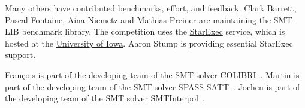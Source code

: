 \documentclass[12pt]{article}
\begin{document}
Many others have contributed benchmarks, effort, and feedback.  Clark Barrett,
Pascal Fontaine, Aina Niemetz and Mathias Preiner are maintaining the SMT-LIB
benchmark library.
The competition uses the
\href{https://www.starexec.org/}{StarExec} service, which is hosted at
the \href{http://www.cs.uiowa.edu/}{University of Iowa}.  Aaron Stump
is providing essential StarExec support.

Fran\c{c}ois is part of the developing team of the SMT solver COLIBRI~\cite{colibri}.
%
Martin is part of the developing team of the SMT solver
SPASS-SATT~\cite{spass-satt}.
%
Jochen is part of the developing team of the SMT solver
SMTInterpol~\cite{smtinterpol}.


\pagebreak



\end{document}
